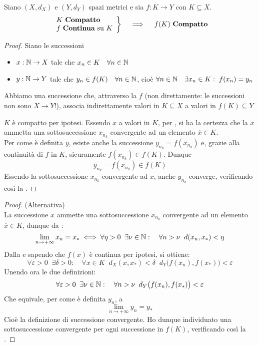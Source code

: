 \begin{theorem}
	\label{teo:weier_generale}
	Siano $(X,d_X)$ e $(Y,d_Y)$ spazi metrici e sia $f:K \to Y$ con $K \subseteq X$.
	\begin{equation*}
		\left.
		\begin{array}{l}
		K \text{ \textbf{Compatto}} \\
		f \text{ \textbf{Continua} su } K
		\end{array}
		\right\}
		\quad \implies \quad
		f(K) \text{ \textbf{Compatto}}
	\end{equation*}
	\begin{proof}
		Siano le successioni
		\begin{itemize}
			\item $x: \mathbb{N} \to X$ tale che $x_n \in K \quad \forall n \in \mathbb{N}$
			\item $y: \mathbb{N} \to Y$ tale che $y_n \in f(K) \quad \forall n \in \mathbb{N}$, cioè $\forall n \in \mathbb{N} \quad \exists x_n \in K: \; f(x_n) = y_n$
		\end{itemize}
		\begin{note}
			Abbiamo una successione che, attraverso la $f$ (non direttamente: le successioni non sono $X \to Y$!), associa indirettamente valori in $K \subseteq X$ a valori in $f(K) \subseteq Y$
		\end{note}
		$K$ è compatto per ipotesi. Essendo $x$ a valori in $K$, per , si ha la certezza che la $x$ ammetta una sottosuccessione $x_{n_k}$ convergente ad un elemento $\overline{x} \in K$.\\
		Per come è definita $y$, esiste anche la successione $y_{n_k} = f(x_{n_k})$ e, grazie alla continuità di $f$ in $K$, sicuramente $f(x_{n_k}) \in f(K)$. Dunque
		\[y_{n_k} = f(x_{n_k}) \in f(K)\]
		Essendo la sottosuccessione $x_{n_k}$ convergente ad $\overline{x}$, anche $y_{n_k}$ converge, verificando così la .
	\end{proof}
	\begin{proof} (Alternativa)\\
		La successione $x$ ammette una sottosuccessione $x_{n_k}$ convergente ad un elemento $\overline{x} \in K$, dunque da :
		\[\lim\limits_{n \to+\infty}x_n=x_*\iff\forall\eta > 0\;\;\exists\nu\in\mathbb{N}:\quad\forall n>\nu\;\;d(x_n,x_*)<\eta\]
		Dalla  e sapendo che $f(x)$ è continua per ipotesi, si ottiene:
		\[\forall\varepsilon > 0\;\;\exists\delta > 0:\quad\forall x \in K\;\;d_X (x,x_*)<\delta\;\;d_Y \bigl(f(x_n),f(x_*)\bigr)<\varepsilon\]
		Unendo ora le due definizioni:
		\[\forall \varepsilon > 0\;\;\exists \nu \in \mathbb{N}:\quad \forall n > \nu\;\;d_Y \bigl(f(x_n),f(x_*)\bigr)<\varepsilon\]
		Che equivale, per come è definita $y_n$, a
		\[\lim\limits_{n \to +\infty}y_n = y_*\]
		Cioè la definizione di successione convergente. Ho dunque individuato una sottosuccessione convergente per ogni successione in $f(K)$, verificando così la .
	\end{proof}
\end{theorem}
